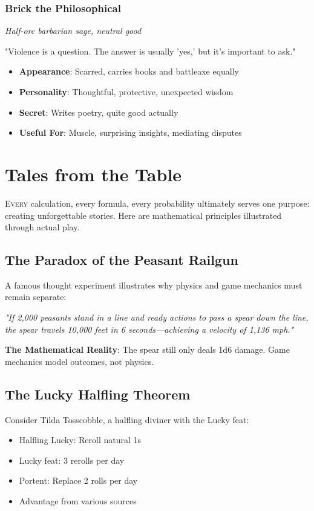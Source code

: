 \documentclass[11pt,letterpaper,openany]{book}
\begin{document}
\subsection{Brick the Philosophical}
\textit{Half-orc barbarian sage, neutral good}

"Violence is a question. The answer is usually 'yes,' but it's important to ask."

\begin{itemize}
    \item \textbf{Appearance}: Scarred, carries books and battleaxe equally
    \item \textbf{Personality}: Thoughtful, protective, unexpected wisdom
    \item \textbf{Secret}: Writes poetry, quite good actually
    \item \textbf{Useful For}: Muscle, surprising insights, mediating disputes
\end{itemize}

\chapter{Tales from the Table}

\lettrine[lines=3]{E}{very} calculation, every formula, every probability ultimately serves one purpose: creating unforgettable stories. Here are mathematical principles illustrated through actual play.

\section{The Paradox of the Peasant Railgun}

A famous thought experiment illustrates why physics and game mechanics must remain separate:

\textit{"If 2,000 peasants stand in a line and ready actions to pass a spear down the line, the spear travels 10,000 feet in 6 seconds—achieving a velocity of 1,136 mph."}

\textbf{The Mathematical Reality}: The spear still only deals 1d6 damage. Game mechanics model outcomes, not physics.

\section{The Lucky Halfling Theorem}

Consider Tilda Tosscobble, a halfling diviner with the Lucky feat:
\begin{itemize}
    \item Halfling Lucky: Reroll natural 1s
    \item Lucky feat: 3 rerolls per day
    \item Portent: Replace 2 rolls per day
    \item Advantage from various sources
\end{itemize}
\end{document}
